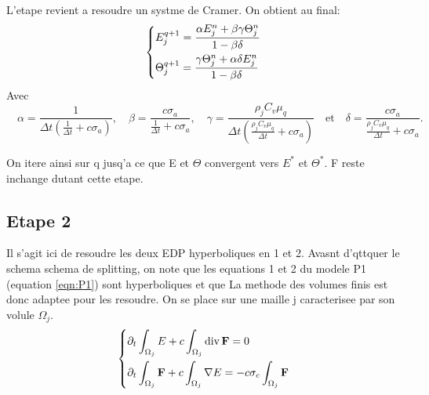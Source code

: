 L'etape revient a resoudre un systme de Cramer. On obtient au final:
\begin{equation} 
    \begin{dcases}
     E_j^{q+1} = \dfrac{\alpha E_j^n + \beta \gamma \Theta_j^n}{1 - \beta \delta} \\
     \Theta_j^{q+1} = \dfrac{\gamma \Theta_j^n + \alpha \delta E_j^n}{1 - \beta \delta} 
    \end{dcases}
\label{eqn:Step1}
\end{equation}
Avec $\quad  \alpha = \dfrac{1}{\Delta t \left( \frac{1}{\Delta t} + c \sigma_a \right)} ,\quad 
\beta = \dfrac{c \sigma_a}{\frac{1}{\Delta t} + c \sigma_a} ,\quad 
\gamma = \dfrac{\rho_j C_v \mu_q}{\Delta t \left( \frac{\rho_j C_v \mu_q}{\Delta t} + c \sigma_a \right)} \quad \text{et} \quad  
\delta = \dfrac{c \sigma_a}{\frac{\rho_j C_v \mu_q}{\Delta t} + c \sigma_a}.$

On itere ainsi sur q jusq'a ce que E et $\Theta$ convergent vers $E^*$ et $\Theta^*$. F reste inchange dutant cette etape.

\subsection{Etape 2}
Il s'agit ici de resoudre les deux EDP hyperboliques en 1 et 2. 
Avasnt d'qttquer le schema schema de splitting, on note que les equations 1 et 2 du modele P1 (equation \ref{eqn:P1}) sont hyperboliques et que La methode des volumes finis est donc adaptee pour les resoudre. On se place sur une maille j caracterisee par son volule $\Omega_j$.
\begin{equation*} 
    \begin{dcases}
    \partial_t \int_{\Omega_j} E + c \int_{\Omega_j} \operatorname{div} \mathbf{F}  = 0\\
    \partial_t \int_{\Omega_j} \mathbf{F} + c \int_{\Omega_j} \nabla E = -c \sigma_c \int_{\Omega_j} \mathbf{F} 
    \end{dcases}   
\end{equation*}

